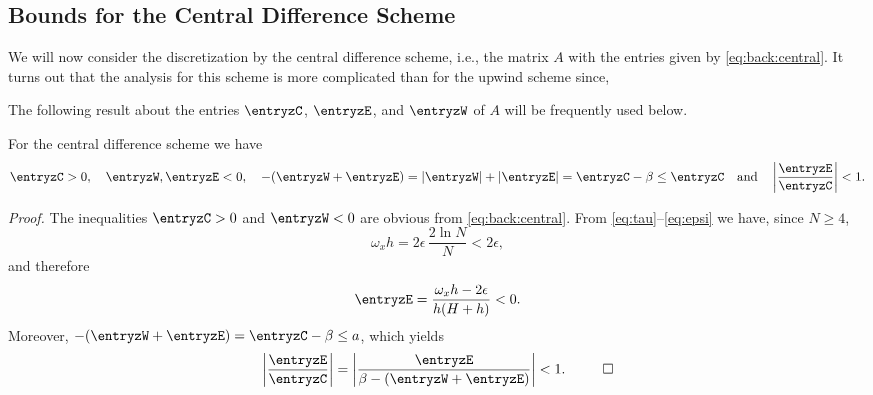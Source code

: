 \subsection{Bounds for the Central Difference Scheme}
\label{1D:SchBnds:central}

We will now consider the discretization by the central difference scheme,
i.e., the matrix $A$ with the entries given by \eqref{eq:back:central}. It turns
out that the analysis for this scheme is more complicated than for the upwind
scheme since, 



The following result about the entries $\entryzC$, $\entryzE$, and $\entryzW$
of $A$ will be frequently used below.


\begin{lemma}
For the central difference scheme we have
%
\begin{equation}\label{eq:1D:bc}
\entryzC>0,\quad \entryzW, \entryzE<0,\quad
-(\entryzW+\entryzE)=|\entryzW|+|\entryzE|
= \entryzC-\beta \leq\entryzC\quad \mbox{and}\quad
\left|\frac{\entryzE}{\entryzC}\right|<1.
\end{equation}
%
\end{lemma}

{\em Proof.}
The inequalities $\entryzC>0$ and $\entryzW<0$ are obvious from
\eqref{eq:back:central}. From \eqref{eq:tau}--\eqref{eq:epsi} we have, since
$N\geq 4$,
%
\begin{equation}\label{eq:1D:alpha_ineq}
\omega_x h = 2\epsilon \,\frac{2\ln N}{N} < 2\epsilon,
\end{equation}
%
and therefore
%
$$\entryzE=\frac{\omega_x h-2\epsilon}{h(H+h)}<0.$$
%
Moreover, $-(\entryzW+\entryzE)=\entryzC -\beta \leq a$, which yields
%
\begin{eqnarray*}
\left|\frac{\entryzE}{\entryzC}\right|  =
\left|\frac{\entryzE}{\beta-(\entryzW+\entryzE)}\right|<1. ~~ \qed
\end{eqnarray*}
%


